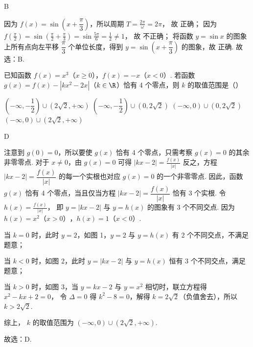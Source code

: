 \begin{answer}
B
\end{answer}

\begin{solution}
因为 \( f(x)=\sin\left( x+\dfrac{\pi}{3} \right) \)，所以周期
\(T=\frac{2\pi}{\omega}=2\pi\)，
故  正确；
因为
\(f\left( \frac{\pi}{2} \right)=\sin\left( \frac{\pi}{2}+\frac{\pi}{3} \right)=\sin\frac{5\pi}{6}=\frac12\neq1\)，
故  不正确；
将函数 \( y=\sin x \) 的图象上所有点向左平移 \( \dfrac{\pi}{3} \) 个单位长度，得到 \( y=\sin\left( x+\dfrac{\pi}{3} \right) \) 的图象，故  正确.
故选：B.
\end{solution}

\begin{problem}
已知函数 \(f(x)=x^3\)（\(x\ge 0\)），\(f(x)=-x\)（\(x<0\)）. 若函数 \(g(x)=f(x)-\left| kx^2-2x \right|\)（\(k\in\R\)）恰有 4 个零点，则 \(k\) 的取值范围是（\quad）

\choices
    {\(\left( -\infty,-\dfrac12 \right)\cup\left( 2\sqrt2,+\infty \right)\)}
    {\(\left( -\infty,-\dfrac12 \right)\cup\left( 0,2\sqrt2 \right)\)}
    {\(\left( -\infty,0 \right)\cup\left( 0,2\sqrt2 \right)\)}
    {\(\left( -\infty,0 \right)\cup\left( 2\sqrt2,+\infty \right)\)}
\end{problem}

\begin{answer}
D
\end{answer}

\begin{solution}
注意到 \( g(0)=0 \)，所以要使 \( g(x) \) 恰有 4 个零点，只需考察 \( g(x)=0 \) 的其余非零零点. 对于 \( x\neq0 \)，由 \( g(x)=0 \) 可得
\(\left| kx-2 \right|=\frac{f(x)}{|x|}\)
反之，方程 \( \left| kx-2 \right|=\dfrac{f(x)}{|x|} \) 的每一个实根也对应 \( g(x)=0 \) 的一个非零零点. 因此，函数 \( g(x) \) 恰有 4 个零点，当且仅当方程 \( \left| kx-2 \right|=\dfrac{f(x)}{|x|} \) 恰有 3 个实根.
令
\(h(x)=\frac{f(x)}{|x|}\)，
即 \( y=\left| kx-2 \right| \) 与 \( y=h(x) \) 的图象有 3 个不同交点.
因为
\(h(x)=x^2\text{（}x>0\text{）}\)，\(h(x)=1\text{（}x<0\text{）}\).

当 \( k=0 \) 时，此时 \( y=2 \)，如图 1，\( y=2 \) 与 \( y=h(x) \) 有 2 个不同交点，不满足题意；


当 \( k<0 \) 时，如图 2，此时 \( y=\left| kx-2 \right| \) 与 \( y=h(x) \) 恒有 3 个不同交点，满足题意；


当 \( k>0 \) 时，如图 3，当 \( y=kx-2 \) 与 \( y=x^2 \) 相切时，联立方程得
\(x^2-kx+2=0\)，
令 \( \Delta=0 \) 得 \( k^2-8=0 \)，解得 \( k=2\sqrt2 \)（负值舍去），所以 \( k>2\sqrt2 \).


综上， \( k \) 的取值范围为 \( \left( -\infty,0 \right)\cup\left( 2\sqrt2,+\infty \right) \).

故选：D.
\end{solution}
